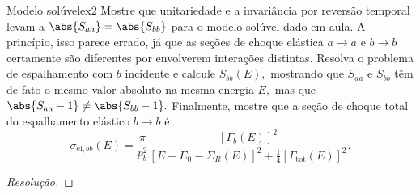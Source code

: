 \begin{exercício}{Modelo solúvel}{ex2}
   Mostre que unitariedade e a invariância por reversão temporal levam a \(\abs{S_{aa}} = \abs{S_{bb}}\) para o modelo solúvel dado em aula. A princípio, isso parece errado, já que as seções de choque elástica \(a \to a\) e \(b \to b\) certamente são diferentes por envolverem interações distintas. Resolva o problema de espalhamento com \(b\) incidente e calcule \(S_{bb}(E),\) mostrando que \(S_{aa}\) e \(S_{bb}\) têm de fato o mesmo valor absoluto na mesma energia \(E,\) mas que \(\abs{S_{aa} - 1} \neq \abs{S_{bb} - 1}.\) Finalmente, mostre que a seção de choque total do espalhamento elástico \(b \to b\) é
   \begin{equation*}
      \sigma_{\mathrm{el},bb}(E) = \frac{\pi}{p_b^2} \frac{\left[\Gamma_b(E)\right]^2}{\left[E - E_0 - \Sigma_R(E)\right]^2 + \frac14 \left[\Gamma_{\mathrm{tot}}(E)\right]^2}.
   \end{equation*}
\end{exercício}
\begin{proof}[Resolução]
    
\end{proof}
